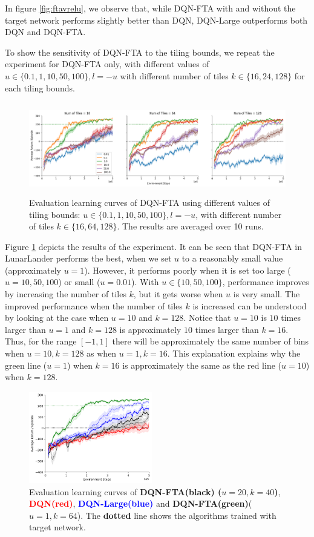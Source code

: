 \documentclass{article}
\begin{document}
In figure \ref{fig:ftavrelu}, we observe that, while DQN-FTA with and without the target network performs slightly better than DQN, DQN-Large outperforms both DQN and DQN-FTA.

To show the sensitivity of DQN-FTA to the tiling bounds, we repeat the experiment for DQN-FTA only, with different values of $u \in \{0.1,1,10,50,100\}, l = -u$ with different number of tiles $k \in \{16, 24, 128\}$ for each tiling bounds.

\begin{figure}[h]
    \centering
    \includegraphics[height=4cm]{sweepfta.png}
    \caption{Evaluation learning curves of DQN-FTA using different values of tiling bounds: $u \in \{0.1, 1, 10, 50, 100\}, l = -u$, with different number of tiles $k \in \{16, 64, 128\}$. The results are averaged over 10 runs.}
    \label{fig:sweepfta}
\end{figure}

Figure \ref{fig:sweepfta} depicts the results of the experiment.
It can be seen that DQN-FTA in LunarLander performs the best, when we set $u$ to a reasonably small value (approximately $u = 1$).
However, it performs poorly when it is set too large ($u=10, 50, 100$) or small ($u=0.01$).
With $u \in \{10, 50, 100\}$, performance improves by increasing the number of tiles $k$, but it gets worse when $u$ is very small.
The improved performance when the number of tiles $k$ is increased can be understood by looking at the case when $u=10$ and $k=128$.
Notice that $u=10$ is $10$ times larger than $u=1$ and $k=128$ is approximately $10$ times larger than $k=16$.
Thus, for the range $[-1, 1]$ there will be approximately the same number of bins when $u=10, k=128$ as when $u=1, k=16$.
This explanation explains why the green line ($u=1$) when $k=16$ is approximately the same as the red line ($u=10$) when $k=128$.

\begin{figure}[h]
    \centering
    \includegraphics[height=4cm]{bestfta.png}
    \caption{Evaluation learning curves of {\bf DQN-FTA(black) ($u=20, k = 40$)}, {\textcolor{red} {\bf DQN(red)}},  {\textcolor{blue} {\bf DQN-Large(blue)}} and {\textcolor{mygreen} {\bf DQN-FTA(green)}($u=1, k=64$)}. The {\bf dotted} line shows the algorithms trained with target network.}
    \label{fig:bestfta}
\end{figure}
\end{document}
